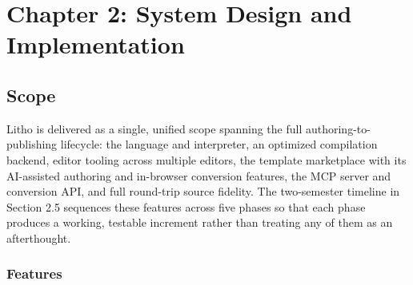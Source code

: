 \documentclass[a4paper,twoside]{article}
\begin{document}
\section{Chapter 2: System Design and Implementation}

\subsection{Scope}

Litho is delivered as a single, unified scope spanning the full authoring-to-publishing lifecycle: the language and interpreter, an optimized compilation backend, editor tooling across multiple editors, the template marketplace with its AI-assisted authoring and in-browser conversion features, the MCP server and conversion API, and full round-trip source fidelity. The two-semester timeline in Section 2.5 sequences these features across five phases so that each phase produces a working, testable increment rather than treating any of them as an afterthought.

\subsubsection{Features}
\end{document}

